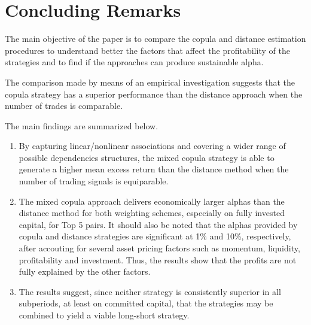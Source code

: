 \documentclass[a4paper,12pt]{report}
\begin{document}
\vspace{1.0cm}
	
	\section{Concluding Remarks}
	
The main objective of the paper is to compare the copula and distance estimation procedures to understand better the factors that affect the profitability of the strategies and to find if the approaches can produce sustainable alpha.

The comparison made by means of an empirical investigation suggests that the copula strategy has a superior performance than the distance approach when the number of trades is comparable.

The main findings are summarized below.

\begin{enumerate}
	
	
	\item By capturing linear/nonlinear associations and covering a wider range of possible dependencies structures, the mixed copula strategy is able to generate a higher mean excess return than the distance method when the number of trading signals is equiparable.
	
	\vspace{0.3cm}
	
	\item 	The mixed copula approach delivers economically larger alphas than the distance method for both weighting schemes, especially on fully invested capital, for Top 5 pairs. It should also be noted that the alphas provided by copula and distance strategies are significant at 1\% and 10\%, respectively, after accouting for several asset pricing factors such as momentum, liquidity, profitability and investment. Thus, the results show that the profits are not fully explained by the other factors.
	
	\vspace{0.3cm}
	
	
	\item	The results suggest, since neither strategy is consistently superior in all subperiods, at least on committed capital, that the strategies may be combined to yield a viable long-short strategy.
	
\end{enumerate}

\vspace{0.3cm}
\end{document}
